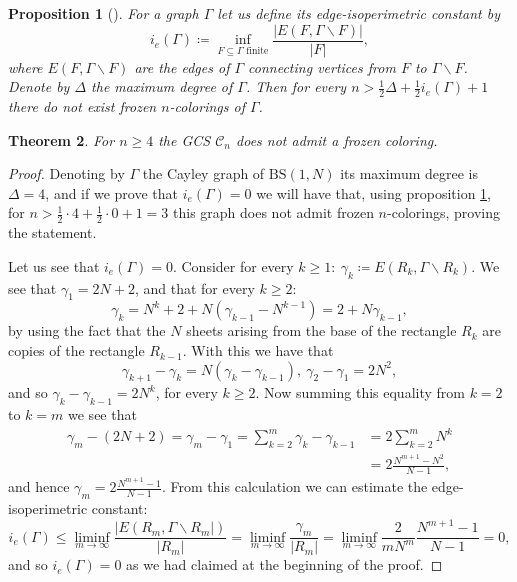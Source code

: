 \documentclass[cupthm,crop,info]{CUP-JNL-ETS}%
\theoremstyle{cupplain}
\newtheorem{theorem}{Theorem}[section]
\newtheorem{proposition}[theorem]{Proposition}
\theoremstyle{cupdefinition}
\theoremstyle{cupremark}
\theoremstyle{cupproof}
\newtheorem{proof}{Proof}
\numberwithin{equation}{section}
\newcommand{\BS}[1][N]{\mathrm{BS}(1,#1)}
\begin{document}
\begin{proposition}[{\cite[Proposition~2.2]{alon2019mixing}}]\label{prop:nofroz_graph} For a graph $\Gamma$ let us define its \textit{edge-isoperimetric constant} by
	$$
	i_e(\Gamma)\coloneqq \inf_{F\subseteq \Gamma \text{ finite}}\frac{|E(F,\Gamma\backslash F)|}{|F|},
	$$
	where $E(F,\Gamma\backslash F)$ are the edges of $\Gamma$ connecting vertices from $F$ to $\Gamma\backslash F$. Denote by $\Delta$ the maximum degree of $\Gamma$. Then for every $n>\frac{1}{2}\Delta+\frac{1}{2}i_e(\Gamma)+1$ there do not exist frozen $n$-colorings of $\Gamma$.
\end{proposition}
\begin{theorem}\label{thm:no_frozen_n_ge_4} For $n\ge 4$ the GCS $\mathcal{C}_n$ does not admit a frozen coloring.
\end{theorem}
\begin{proof}
	Denoting by $\Gamma$ the Cayley graph of $\BS$ its maximum degree is $\Delta=4$, and if we prove that $i_e(\Gamma)=0$ we will have that, using proposition \ref{prop:nofroz_graph}, for $n>\frac{1}{2}\cdot 4+\frac{1}{2}\cdot 0+1=3$ this graph does not admit frozen $n$-colorings, proving the statement.
	
	Let us see that $i_e(\Gamma)=0$. Consider for every $k\ge 1: \ \gamma_{k}\coloneqq E(R_k,\Gamma\backslash R_k)$. We see that $\gamma_1=2N+2$, and that for every $k\ge 2$:
	$$
	\gamma_k=N^k+2+N(\gamma_{k-1}-N^{k-1})=2+N\gamma_{k-1},
	$$
	by using the fact that the $N$ sheets arising from the base of the rectangle $R_k$ are copies of the rectangle $R_{k-1}$. 
	With this we have that 
	$$
	\gamma_{k+1}-\gamma_{k}=N(\gamma_k-\gamma_{k-1}), \ \gamma_{2}-\gamma_{1}=2N^2,
	$$
	and so $\gamma_{k}-\gamma_{k-1}=2N^k$, for every $k\ge 2$. Now summing this equality from $k=2$ to $k=m$ we see that
	\begin{align*}
	\gamma_{m}-(2N+2)=\gamma_{m}-\gamma_{1}=\sum_{k=2}^m \gamma_{k}-\gamma_{k-1}&=2\sum_{k=2}^m N^k \\
	&= 2\frac{N^{m+1}-N^2}{N-1},
	\end{align*}
	and hence $\gamma_{m}=2\frac{N^{m+1}-1}{N-1}$. From this calculation we can estimate the edge-isoperimetric constant:
	$$
	i_e(\Gamma)\le \liminf_{m\to \infty}\frac{|E(R_m,\Gamma\backslash R_m|)}{|R_m|}=\liminf_{m\to \infty}\frac{\gamma_m}{|R_m|}=\liminf_{m\to \infty}\frac{2}{mN^m}\frac{N^{m+1}-1}{N-1}=0,
	$$
	and so $i_e(\Gamma)=0$ as we had claimed at the beginning of the proof.
\end{proof}
\end{document}
